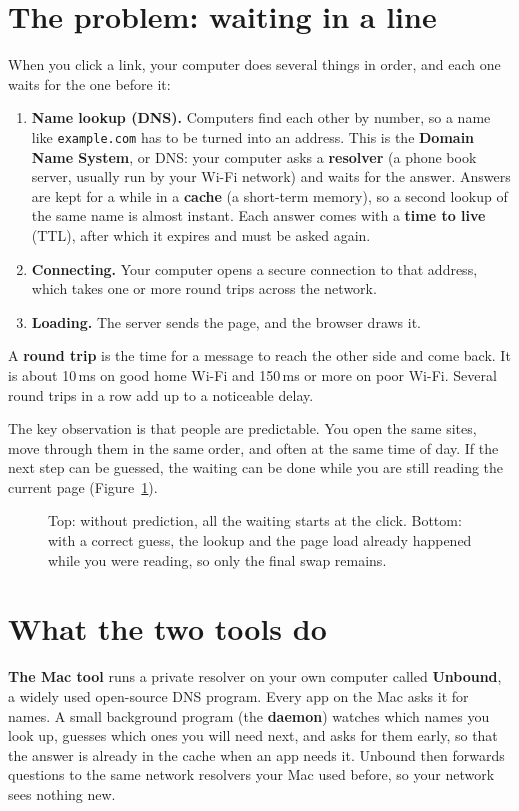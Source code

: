 \documentclass[11pt]{article}
\newcommand{\term}[1]{\textbf{#1}}
\begin{document}
\section{The problem: waiting in a line}
When you click a link, your computer does several things in order, and each one waits for the one before it:
\begin{enumerate}
\item \term{Name lookup (DNS).} Computers find each other by number, so a name like \texttt{example.com} has to be turned into an address. This is the \term{Domain Name System}, or DNS: your computer asks a \term{resolver} (a phone book server, usually run by your Wi-Fi network) and waits for the answer. Answers are kept for a while in a \term{cache} (a short-term memory), so a second lookup of the same name is almost instant. Each answer comes with a \term{time to live} (TTL), after which it expires and must be asked again.
\item \term{Connecting.} Your computer opens a secure connection to that address, which takes one or more round trips across the network.
\item \term{Loading.} The server sends the page, and the browser draws it.
\end{enumerate}
A \term{round trip} is the time for a message to reach the other side and come back. It is about 10\,ms on good home Wi-Fi and 150\,ms or more on poor Wi-Fi. Several round trips in a row add up to a noticeable delay.

The key observation is that people are predictable. You open the same sites, move through them in the same order, and often at the same time of day. If the next step can be guessed, the waiting can be done while you are still reading the current page (Figure~\ref{fig:time}).

\begin{figure}[h]
\centering
\timelinediagram
\caption{Top: without prediction, all the waiting starts at the click. Bottom: with a correct guess, the lookup and the page load already happened while you were reading, so only the final swap remains.}
\label{fig:time}
\end{figure}

\section{What the two tools do}
\textbf{The Mac tool} runs a private resolver on your own computer called \term{Unbound}, a widely used open-source DNS program. Every app on the Mac asks it for names. A small background program (the \term{daemon}) watches which names you look up, guesses which ones you will need next, and asks for them early, so that the answer is already in the cache when an app needs it. Unbound then forwards questions to the same network resolvers your Mac used before, so your network sees nothing new.
\end{document}
